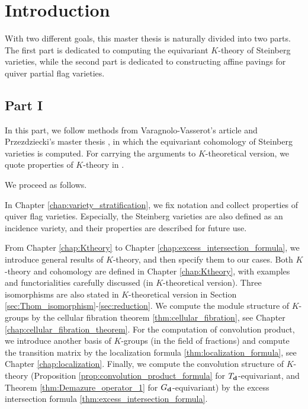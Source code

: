 \chapter*{Introduction}

With two different goals, this master thesis is naturally divided into two parts. The first part is dedicated to computing the equivariant $K$-theory of Steinberg varieties, while the second part is dedicated to constructing affine pavings for quiver partial flag varieties.

\section*{Part I}

In this part, we follow methods from Varagnolo-Vasserot's article \cite{varagnolo2011canonical} and Przezdziecki's master thesis \cite{przezdziecki2015geometric}, in which the equivariant cohomology of Steinberg varieties is computed. For carrying the arguments to $K$-theoretical version, we quote properties of $K$-theory in \cite[Chapter 5]{chriss1997representation}.

We proceed as follows.

In Chapter \ref{chap:variety_stratification}, we fix notation and collect properties of quiver flag varieties. Especially, the Steinberg varieties are also defined as an incidence variety, and their properties are described for future use.

From Chapter \ref{chap:Ktheory} to Chapter \ref{chap:excess_intersection_formula}, we introduce general results of $K$-theory, and then specify them to our cases. Both $K$-theory and cohomology are defined in Chapter \ref{chap:Ktheory}, with examples and functorialities carefully discussed (in $K$-theoretical version). Three isomorphisms are also stated in $K$-theoretical version in Section \ref{sec:Thom_isomorphism}-\ref{sec:reduction}. We compute the module structure of $K$-groups by the cellular fibration theorem \ref{thm:cellular_fibration}, see Chapter \ref{chap:cellular_fibration_theorem}. For the computation of convolution product, we introduce another basis of $K$-groups (in the field of fractions) and compute the transition matrix by the localization formula \ref{thm:localization_formula}, see Chapter \ref{chap:localization}. Finally, we compute the convolution structure of $K$-theory (Proposition \ref{prop:convolution_product_formula} for $T_{\mathbf{d}}$-equivariant, and Theorem \ref{thm:Demazure_operator_1} for $G_{\mathbf{d}}$-equivariant) by the excess intersection formula \ref{thm:excess_intersection_formula}.

